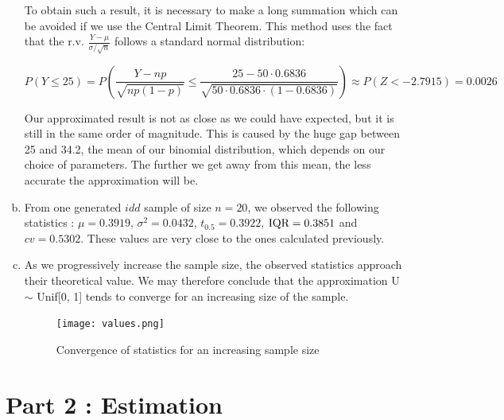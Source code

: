 \documentclass[a4paper]{article}
\begin{document}
\begin{enumerate}[(a)]
To obtain such a result, it is necessary to make a long summation which can be avoided if we use the Central Limit Theorem. This method uses the fact that the r.v. $\frac{Y-\mu}{\sigma / \sqrt{n}}$ follows a standard normal distribution:

$$P(Y \leq 25) = P\left ( \frac{Y-np}{\sqrt{np(1-p)}} \leq \frac{25-50\cdot0.6836}{\sqrt{50\cdot0.6836\cdot(1-0.6836)}} \right ) \approx P(Z < -2.7915) = 0.0026$$

Our approximated result is not as close as we could have expected, but it is still in the same order of magnitude. This is caused by the huge gap between 25 and 34.2, the mean of our binomial distribution, which depends on our choice of parameters. The further we get away from this mean, the less accurate the approximation will be.

\item From one generated $idd$ sample of size $n = 20$, we observed the following statistics : $\mu = 0.3919$, $\sigma^2 = 0.0432$, $t_0.5 = 0.3922$, $\textup{IQR} = 0.3851$ and $cv = 0.5302$.
These values are very close to the ones calculated previously.

\item As we progressively increase the sample size, the observed statistics approach their theoretical value. We may therefore conclude that the approximation U $\sim$ Unif[0, 1] tends to converge for an increasing size of the sample.

\begin{figure}
    \centering
  \texttt{[image: values.png]}
  \caption{Convergence of statistics for an increasing sample size}
\end{figure}

\end{enumerate}


\newpage

\section{Part 2 : Estimation}
\end{document}
